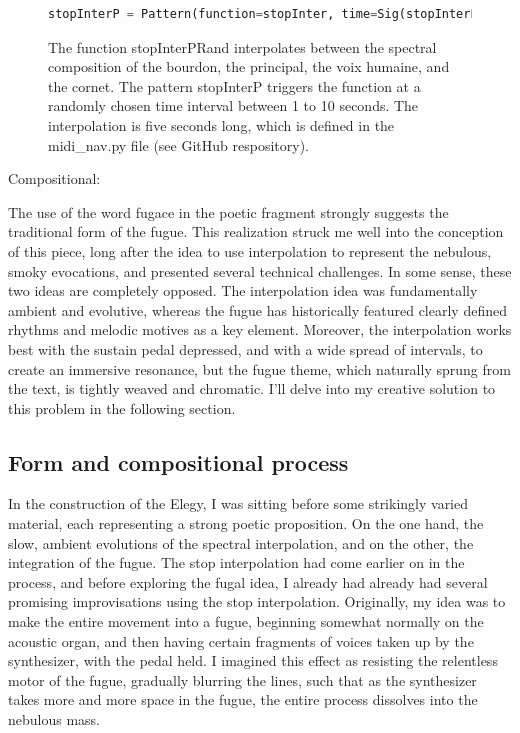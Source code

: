 \documentclass[12pt,twoside,maitrise]{dms_ks}
\theoremstyle{definition}
\begin{document}
{\begin{figure}[H]
\begin{lstlisting}[language=Python]
stopInterP = Pattern(function=stopInter, time=Sig(stopInterPRand))
\end{lstlisting}
\caption{The function stopInterPRand interpolates between the spectral composition of the bourdon, the principal, the voix humaine, and the cornet.
The pattern stopInterP triggers the function at a randomly chosen time interval between 1 to 10 seconds.
The interpolation is five seconds long, which is defined in the midi\_nav.py file (see GitHub respository).}
\end{figure}

Compositional:

The use of the word fugace in the poetic fragment strongly suggests the traditional form of the fugue. This realization struck me well into the conception of this piece, long after the idea to use interpolation to represent the nebulous, smoky evocations, and presented several technical challenges. In some sense, these two ideas are completely opposed. The interpolation idea was fundamentally ambient and evolutive, whereas the fugue has historically featured clearly defined rhythms and melodic motives as a key element. Moreover, the interpolation works best with the sustain pedal depressed, and with a wide spread of intervals, to create an immersive resonance, but the fugue theme, which naturally sprung from the text, is tightly weaved and chromatic. I'll delve into my creative solution to this problem in the following section.

\subsection{Form and compositional process}

In the construction of the Elegy, I was sitting before some strikingly varied material, each representing a strong poetic proposition. On the one hand, the slow, ambient evolutions of the spectral interpolation, and on the other, the integration of the fugue. The stop interpolation had come earlier on in the process, and before exploring the fugal idea, I already had already had several promising improvisations using the stop interpolation. Originally, my idea was to make the entire movement into a fugue, beginning somewhat normally on the acoustic organ, and then having certain fragments of voices taken up by the synthesizer, with the pedal held. I imagined this effect as resisting the relentless motor of the fugue, gradually blurring the lines, such that as the synthesizer takes more and more space in the fugue, the entire process dissolves into the nebulous mass.

}
\end{document}
